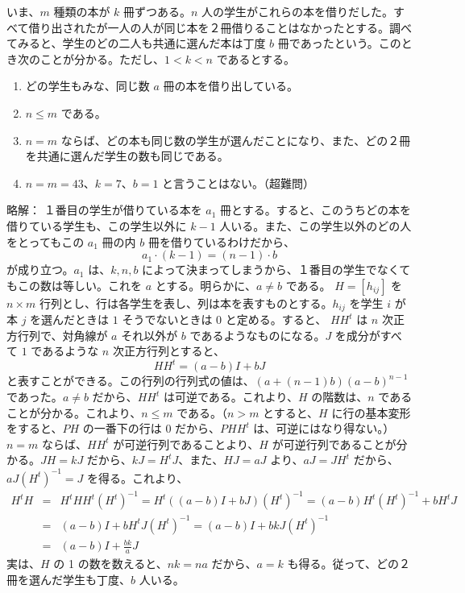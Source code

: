 いま、$m$ 種類の本が $k$ 冊ずつある。$n$ 人の学生がこれらの本を借りだした。すべて借り出されたが一人の人が同じ本を２冊借りることはなかったとする。調べてみると、学生のどの二人も共通に選んだ本は丁度 $b$ 冊であったという。このとき次のことが分かる。ただし、$1<k<n$ であるとする。
\begin{enumerate}
\item どの学生もみな、同じ数 $a$ 冊の本を借り出している。
\item $n\leq m$ である。
\item $n = m$ ならば、どの本も同じ数の学生が選んだことになり、また、どの２冊を共通に選んだ学生の数も同じである。
\item $n = m = 43$、$k = 7$、$b =1$ と言うことはない。（超難問）
\end{enumerate}
{\gt 略解：}\quad
１番目の学生が借りている本を $a_1$ 冊とする。すると、このうちどの本を借りている学生も、この学生以外に $k-1$ 人いる。また、この学生以外のどの人をとってもこの $a_1$ 冊の内 $b$ 冊を借りているわけだから、
$$a_1\cdot (k - 1) = (n-1)\cdot b$$
が成り立つ。$a_1$ は、$k, n, b$ によって決まってしまうから、１番目の学生でなくてもこの数は等しい。これを $a$ とする。明らかに、$a\neq b$ である。
$H = [h_{ij}]$ を $n\times m$ 行列とし、行は各学生を表し、列は本を表すものとする。$h_{ij}$ を学生 $i$ が本 $j$ を選んだときは $1$ そうでないときは $0$ と定める。すると、
$HH^t$ は $n$ 次正方行列で、対角線が $a$ それ以外が $b$ であるようなものになる。$J$ を成分がすべて $1$ であるような $n$ 次正方行列とすると、
$$HH^t = (a-b)I + bJ$$
と表すことができる。この行列の行列式の値は、$(a+(n-1)b)(a-b)^{n-1}$ であった。$a\neq b$ だから、$HH^t$ は可逆である。これより、$H$ の階数は、$n$ であることが分かる。これより、$n\leq m$ である。（$n>m$ とすると、$H$ に行の基本変形をすると、$PH$ の一番下の行は 0 だから、$PHH^t$ は、可逆にはなり得ない。）$n = m$ ならば、$HH^t$ が可逆行列であることより、$H$ が可逆行列であることが分かる。$JH = kJ$ だから、$kJ = H^tJ$、また、$HJ = aJ$ より、$aJ = JH^t$ だから、$aJ(H^t)^{-1} = J$ を得る。これより、
\begin{eqnarray*}
H^tH & = & H^tHH^t(H^t)^{-1} = H^t((a-b)I + bJ)(H^t)^{-1} = (a-b)H^t(H^t)^{-1} + bH^tJ \\
& =  & (a-b)I + bH^tJ(H^t)^{-1} = (a-b)I + bkJ(H^t)^{-1}\\
& = & (a-b)I + \frac{bk}{a}J
\end{eqnarray*}
実は、$H$ の 1 の数を数えると、$nk = na$ だから、$a = k$ も得る。従って、どの２冊を選んだ学生も丁度、$b$ 人いる。

